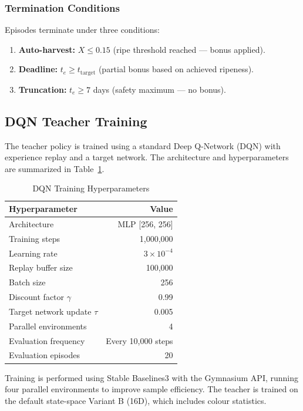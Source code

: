 \subsubsection{Termination Conditions}
Episodes terminate under three conditions:
\begin{enumerate}
    \item \textbf{Auto-harvest:} $X \leq 0.15$ (ripe threshold reached — bonus applied).
    \item \textbf{Deadline:} $t_e \geq t_{\text{target}}$ (partial bonus based on achieved ripeness).
    \item \textbf{Truncation:} $t_e \geq 7$ days (safety maximum — no bonus).
\end{enumerate}

\subsection{DQN Teacher Training}
\label{subsec:dqn_training}

The teacher policy is trained using a standard Deep Q-Network (DQN) \cite{mnih2015dqn} with experience replay and a target network. The architecture and hyperparameters are summarized in Table~\ref{tab:dqn_hyperparams}.

\begin{table}[htbp]
\caption{DQN Training Hyperparameters}
\label{tab:dqn_hyperparams}
\centering
\begin{tabular}{@{}lr@{}}
\toprule
\textbf{Hyperparameter} & \textbf{Value} \\
\midrule
Architecture & MLP [256, 256] \\
Training steps & 1{,}000{,}000 \\
Learning rate & $3 \times 10^{-4}$ \\
Replay buffer size & 100{,}000 \\
Batch size & 256 \\
Discount factor $\gamma$ & 0.99 \\
Target network update $\tau$ & 0.005 \\
Parallel environments & 4 \\
Evaluation frequency & Every 10{,}000 steps \\
Evaluation episodes & 20 \\
\bottomrule
\end{tabular}
\end{table}

Training is performed using Stable Baselines3 \cite{sb3} with the Gymnasium API, running four parallel environments to improve sample efficiency. The teacher is trained on the default state-space Variant B (16D), which includes colour statistics.

